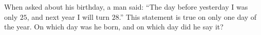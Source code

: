 When asked about his birthday, a man said: ``The day before yesterday I was only $25$, and next year I will turn $28$.'' This statement is true on only one day of the year. On which day was he born, and on which day did he say it?
